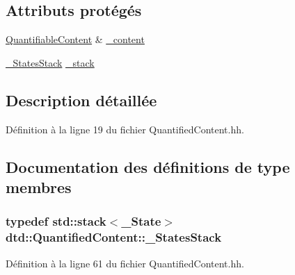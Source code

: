 \subsection*{Attributs protégés}
\begin{DoxyCompactItemize}
\item 
\hyperlink{classdtd_1_1_quantifiable_content}{QuantifiableContent} \& \hyperlink{classdtd_1_1_quantified_content_a7372be0a6613cfb0795038937d73d321}{\_\-content}
\item 
\hyperlink{classdtd_1_1_quantified_content_af5a78d608bdaba704815995fbbe40f10}{\_\-StatesStack} \hyperlink{classdtd_1_1_quantified_content_acf63f34405d6c2b4016b442057fc0c56}{\_\-stack}
\end{DoxyCompactItemize}


\subsection{Description détaillée}


Définition à la ligne 19 du fichier QuantifiedContent.hh.



\subsection{Documentation des définitions de type membres}
\hypertarget{classdtd_1_1_quantified_content_af5a78d608bdaba704815995fbbe40f10}{
\subsubsection[{\_\-StatesStack}]{\setlength{\rightskip}{0pt plus 5cm}typedef std::stack$<${\bf \_\-State}$>$ {\bf dtd::QuantifiedContent::\_\-StatesStack}}}
\label{classdtd_1_1_quantified_content_af5a78d608bdaba704815995fbbe40f10}


Définition à la ligne 61 du fichier QuantifiedContent.hh.



